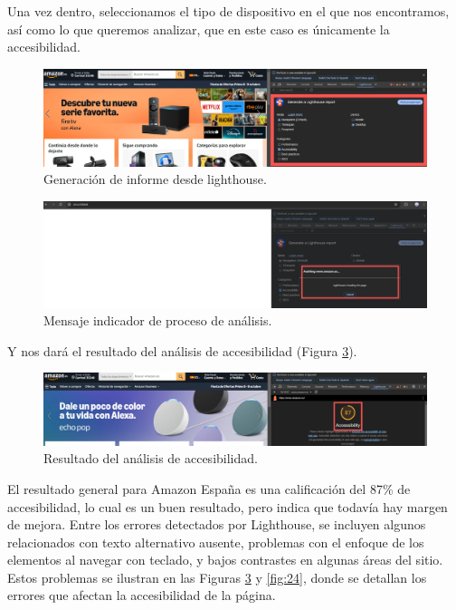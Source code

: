 \documentclass[letterpaper, 12pt]{report}
\begin{document}
Una vez dentro, seleccionamos el tipo de dispositivo en el que nos encontramos, así como lo que queremos analizar, que en este caso es únicamente la accesibilidad.

\begin{figure}[H]
\centering
\includegraphics[width=1\textwidth]{figure21.png}
\caption{Generación de informe desde lighthouse.}
\label{fig:21}
\end{figure}

\begin{figure}[H]
\centering
\includegraphics[width=1\textwidth]{figure22.png}
\caption{Mensaje indicador de proceso de análisis.}
\label{fig:22}
\end{figure}

Y nos dará el resultado del análisis de accesibilidad (Figura \ref{fig:23}).

\begin{figure}[H]
\centering
\includegraphics[width=1\textwidth]{figure23.png}
\caption{Resultado del análisis de accesibilidad.}
\label{fig:23}
\end{figure}

El resultado general para Amazon España es una calificación del 87\% de accesibilidad, lo cual es un buen resultado, pero indica que todavía hay margen de mejora. Entre los errores detectados por Lighthouse, se incluyen algunos relacionados con texto alternativo ausente, problemas con el enfoque de los elementos al navegar con teclado, y bajos contrastes en algunas áreas del sitio. Estos problemas se ilustran en las Figuras \ref{fig:23} y \ref{fig:24}, donde se detallan los errores que afectan la accesibilidad de la página.
\end{document}
